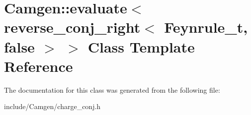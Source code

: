 \hypertarget{a00187}{}\section{Camgen\+:\+:evaluate$<$ reverse\+\_\+conj\+\_\+right$<$ Feynrule\+\_\+t, false $>$ $>$ Class Template Reference}
\label{a00187}


The documentation for this class was generated from the following file\+:\begin{DoxyCompactItemize}
\item 
include/\+Camgen/charge\+\_\+conj.\+h\end{DoxyCompactItemize}
